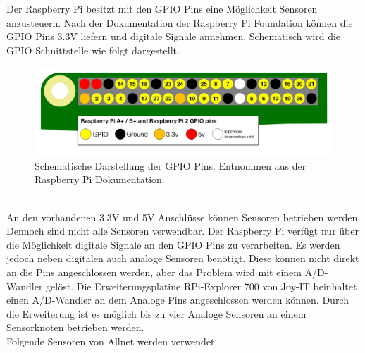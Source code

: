 
Der Raspberry Pi besitzt mit den \ac{GPIO} Pins eine Möglichkeit Sensoren anzusteuern. Nach der Dokumentation der Raspberry Pi Foundation\cite{GPIOMode77:online} können die \ac{GPIO} Pins 3.3V liefern und digitale Signale annehmen. Schematisch wird die \ac{GPIO} Schnittstelle wie folgt dargestellt.
\begin{figure}[h]
	\includegraphics[width=\textwidth]{Bilder/Kapitel2/gpio_pins_pi2.png}
	\caption[Schema GPIO Pins]{Schematische Darstellung der GPIO Pins. Entnommen aus der Raspberry Pi Dokumentation\cite{GPIOMode77:online}.}
	\label{fig:Kapitel2/gpio_pins_pi2.png}
\end{figure}\\
An den vorhandenen 3.3V und 5V Anschlüsse können Sensoren betrieben werden. Dennoch sind nicht alle Sensoren verwendbar. Der Raspberry Pi verfügt nur über die Möglichkeit digitale Signale an den \ac{GPIO} Pins zu verarbeiten. Es werden jedoch neben digitalen auch analoge Sensoren benötigt. Diese können nicht direkt an die Pins angeschlossen werden, aber das Problem wird mit einem \ac{A/D-Wandler} gelöst. Die Erweiterungsplatine RPi-Explorer 700 von Joy-IT \cite{joyitrpi87:online} beinhaltet einen \ac{A/D-Wandler} an dem Analoge Pins angeschlossen werden können. Durch die Erweiterung ist es möglich bis zu vier Analoge Sensoren an einem Sensorknoten betrieben werden.\\
Folgende Sensoren von Allnet\cite{111861pd90:online} werden verwendet:
